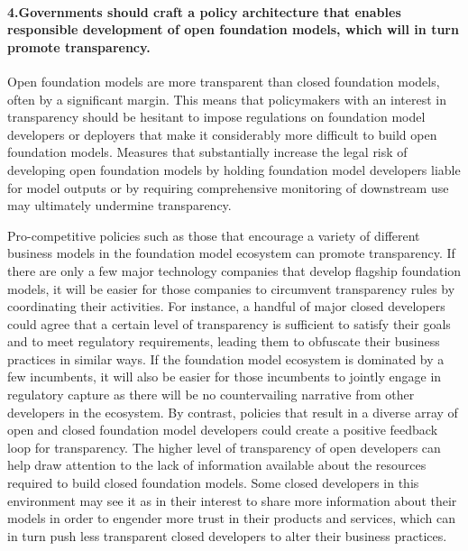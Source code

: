 \paragraph{4.\phantom{X}Governments should craft a policy architecture that enables responsible development of open foundation models, which will in turn promote transparency.}
    \begin{myitemize}
        \item Open foundation models are more transparent than closed foundation models, often by a significant margin. 
        This means that policymakers with an interest in transparency should be hesitant to impose regulations on foundation model developers or deployers that make it considerably more difficult to build open foundation models. 
        Measures that substantially increase the legal risk of developing open foundation models by holding foundation model developers liable for model outputs or by requiring comprehensive monitoring of downstream use may ultimately undermine transparency.
        \item Pro-competitive policies such as those that encourage a variety of different business models in the foundation model ecosystem can promote transparency. 
        If there are only a few major technology companies that develop flagship foundation models, it will be easier for those companies to circumvent transparency rules by coordinating their activities. 
        For instance, a handful of major closed developers could agree that a certain level of transparency is sufficient to satisfy their goals and to meet regulatory requirements, leading them to obfuscate their business practices in similar ways.
        If the foundation model ecosystem is dominated by a few incumbents, it will also be easier for those incumbents to jointly engage in regulatory capture as there will be no countervailing narrative from other developers in the ecosystem.
        By contrast, policies that result in a diverse array of open and closed foundation model developers could create a positive feedback loop for transparency.
        The higher level of transparency of open developers can help draw attention to the lack of information available about the resources required to build closed foundation models.
        Some closed developers in this environment may see it as in their interest to share more information about their models in order to engender more trust in their products and services, which can in turn push less transparent closed developers to alter their business practices.
    \end{myitemize}